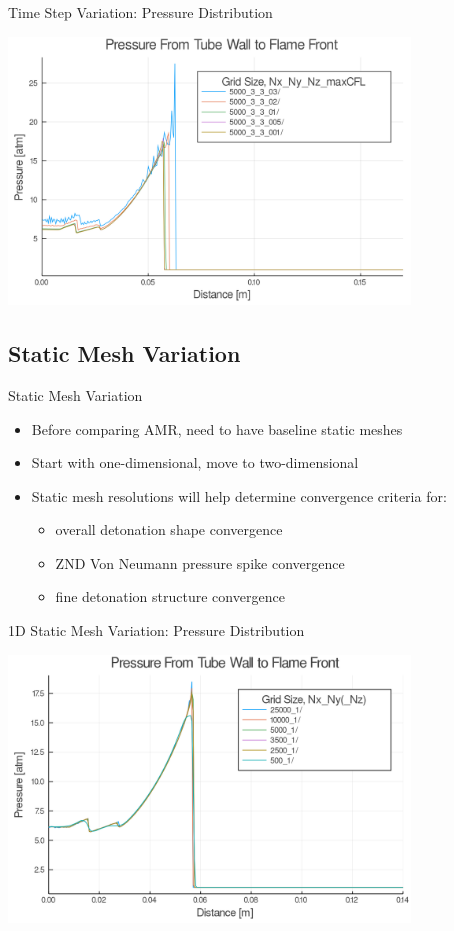 \begin{frame}{Time Step Variation: Pressure Distribution}
\begin{center}
\includegraphics[width=0.8\textwidth]{../figs/cfl_test/p.png}
\end{center}
\end{frame}

\subsection{Static Mesh Variation}

\begin{frame}{Static Mesh Variation}
\begin{itemize}
\item Before comparing AMR, need to have baseline static meshes 
\item Start with one-dimensional, move to two-dimensional 
\item Static mesh resolutions will help determine convergence criteria for:
\begin{itemize}
    \item overall detonation shape convergence 
    \item ZND Von Neumann pressure spike convergence 
    \item fine detonation structure convergence
\end{itemize}
\end{itemize}
\end{frame}

\begin{frame}{1D Static Mesh Variation: Pressure Distribution}
\begin{center}
\includegraphics[width=0.8\textwidth]{../figs/static1d/p.png}
\end{center}
\end{frame}

